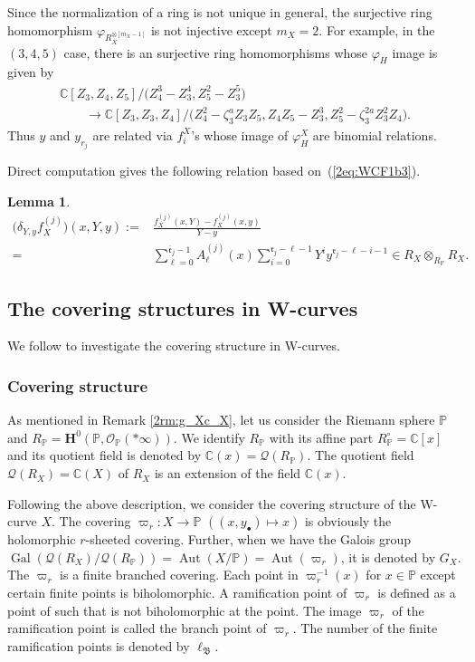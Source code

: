 \documentclass[pdftex]{sigma}
\def\CC{{\mathbb C}}
\def\PP{{\mathbb P}}
\def\bH{{\mathbf F}}
\def\bH{{\mathbf H}}
\def\cO{{\mathcal O}}
\def\cQ{{\mathcal Q}}
\def\fB{{\mathfrak B}}
\def\fr{{\mathfrak r}}
\def\Bfr{{\overline{\mathfrak r}}}
\def\Aut{\operatorname{Aut}}
\def\Gal{\operatorname{Gal}}
\numberwithin{equation}{section}
\newtheorem{Lemma}[Theorem]{Lemma}
\begin{document}
\begin{Remark}
Since the normalization of a ring is not unique in general, the surjective ring homomorphism $\varphi_{R_X^{\otimes[m_X-1]}}$ is not injective except $m_X=2$.
For example, in the $(3,4,5)$ case, there is an surjective ring homomorphisms whose $\varphi_H$ image is given by
\begin{gather*}
\CC[Z_3,Z_4,Z_5]/\big(Z_4^3-Z_3^4,Z_5^2-Z_3^5\big)\\
\qquad{} \to \CC[Z_3,Z_3,Z_4]/\big(Z_4^2- \zeta_3^a Z_3 Z_5, Z_4 Z_5 - Z_3^3, Z_5^2 - \zeta_3^{2a}Z_3^2 Z_4\big).
\end{gather*}
Thus $y$ and $y_{r_j}$ are related via $f^X_i$'s whose
image of $\varphi_H^X$ are binomial relations.
\end{Remark}

Direct computation gives the following relation based on~(\ref{2eq:WCF1b3}).

\begin{Lemma}\label{2lm:dy_rj/dx}
\begin{align*}
\big(\delta_{Y,y} f_X^{(j)}\big)(x,Y,y)
:={}& \frac{f_X^{(j)}(x,Y) - f_X^{(j)}(x,y)}{Y-y} \\
={}& \sum_{\ell=0}^{\Bfr_j-1}A_{\ell}^{(j)}(x)
\sum_{i=0}^{\fr_j-\ell-1}
Y^i y^{\fr_j-\ell-i-1} \in R_X \otimes_{R_\PP} R_X.
\end{align*}
\end{Lemma}

\subsection{The covering structures in W-curves}\label{2sc:Covering}

We follow \cite{Kunz2004, Stichtenoth} to investigate the covering structure in W-curves.

\subsubsection{Covering structure}
\label{2sc:GaloisCover}

As mentioned in Remark \ref{2rm:g_Xc_X}, let us consider the Riemann sphere $\PP$ and $R_\PP=\bH^0(\PP, \cO_{\PP}(*\infty))$. We identify $R_\PP$ with its affine part $R_\PP^\circ=\CC[x]$ and its quotient field is denoted by $\CC(x)=\cQ(R_\PP)$.
The quotient field $\cQ(R_X)=\CC(X)$ of $R_X$ is an extension of the field $\CC(x)$.

Following the above description, we consider the covering structure of the W-curve $X$.
The covering $\varpi_r\colon X \to \PP$ $((x,y_\bullet) \mapsto x)$ is obviously the holomorphic $r$-sheeted covering.
Further, when we have the Galois group $\Gal(\cQ(R_X)/\cQ(R_\PP))=\Aut(X/\PP)=\Aut(\varpi_r)$, it is denoted by $G_X$.
The $\varpi_{r}$ is a finite branched covering.
Each point in $\varpi_r^{-1}(x)$ for $x \in \PP$ except certain finite points is biholomorphic.
A ramification point of $\varpi_{r}$ is defined as a point of such that is not biholomorphic at the point.
The image $\varpi_{r}$ of the ramification point is called the branch point of $\varpi_{r}$. The number of the finite ramification points is denoted by $\ell_{\fB}$.
\end{document}
